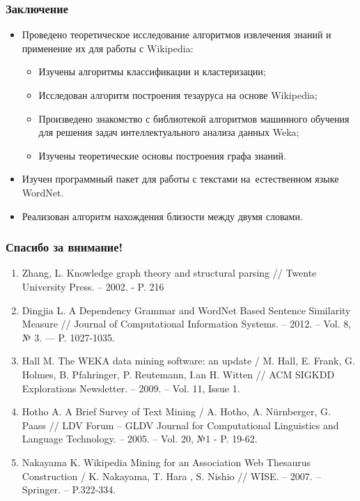 \documentclass{beamer}
\begin{document}
\begin{frame}
\frametitle{Заключение}

\begin{itemize}

\item{Проведено теоретическое исследование алгоритмов извлечения знаний и применение их для работы с Wikipedia:

\begin{itemize}
\item{Изучены алгоритмы классификации и кластеризации;}
\item{Исследован алгоритм построения тезауруса на основе Wikipedia;}
\item{Произведено знакомство с библиотекой алгоритмов машинного обучения для решения задач интеллектуального анализа данных Weka;}
\item{Изучены теоретические основы построения графа знаний.}
\end{itemize}}
\item{Изучен программный пакет для работы с текстами на~естественном языке WordNet.}
\item{Реализован алгоритм нахождения близости между двумя словами.}

\end{itemize}
\end{frame}

\begin{frame}
\frametitle{Спасибо за внимание!}
\begin{enumerate}

\item{Zhang, L.  Knowledge graph theory and structural parsing // Twente University Press. – 2002. -  P. 216}
\item{Dingjia L. A Dependency Grammar and WordNet Based Sentence Similarity Measure // Journal of Computational Information Systems. – 2012. – Vol. 8, № 3. — P. 1027-1035.}
\item{Hall M. The WEKA data mining software: an update / M. Hall, E. Frank, G. Holmes, B. Pfahringer, P. Reutemann, I.an H. Witten // ACM SIGKDD Explorations Newsletter. – 2009. – Vol. 11, Issue 1.}
\item{Hotho A. A Brief Survey of Text Mining / A. Hotho, A. Nürnberger, G. Paass //  LDV Forum – GLDV Journal for Computational Linguistics and Language Technology. – 2005. – Vol. 20, №1 - P. 19-62.}
\item{Nakayama K. Wikipedia Mining for an Association Web Thesaurus Construction / K. Nakayama, T. Hara , S. Nishio // WISE. – 2007. – Springer. – P.322-334.}
\end{enumerate}
\end{frame}
\end{document}
